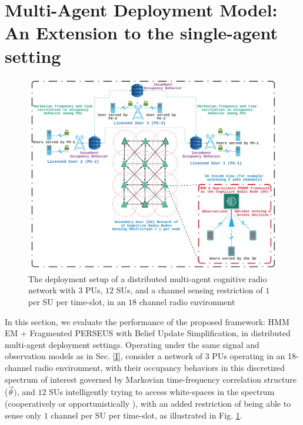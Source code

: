 \documentclass[12pt, draftcls, onecolumn]{IEEEtran}
\begin{document}
\section{Multi-Agent Deployment Model: An Extension to the single-agent setting}\label{Z}
\begin{figure} [htb]
    \centerline{
    \includegraphics[width = 0.8\linewidth]{figures/Minerva_Multiagent_System_Model.png}}
    \caption{The deployment setup of a distributed multi-agent cognitive radio network with $3$ PUs, $12$ SUs, and a channel sensing restriction of $1$ per SU per time-slot, in an $18$ channel radio environment}
    \label{fig: Z. 0}
\end{figure}
In this section, we evaluate the performance of the proposed framework: HMM EM + Fragmented PERSEUS with Belief Update Simplification, in distributed multi-agent deployment settings. Operating under the same signal and observation models as in Sec. \ref{I}, consider a network of $3$ PUs operating in an 18-channel radio environment, with their occupancy behaviors in this discretized spectrum of interest governed by Markovian time-frequency correlation structure ($\vec{\theta})$, and $12$ SUs intelligently trying to access white-spaces in the spectrum (cooperatively \cite{WCL:5} or opportunistically \cite{WCL:MIT}), with an added restriction of being able to sense only $1$ channel per SU per time-slot, as illustrated in Fig. \ref{fig: Z. 0}.
\end{document}
